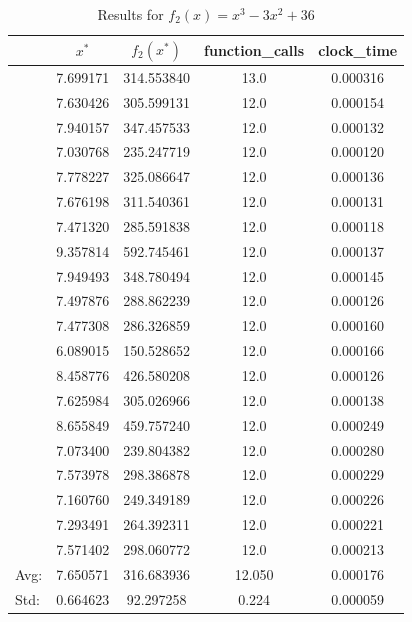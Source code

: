 \documentclass[11pt,onside]{article}
\begin{document}
\begin{description}
\begin {table}[ht]
\centering
\caption {Results for $f_{2}(x) = x^3 - 3x^2 + 36$}
\begin{tabular}{lcccc}
\toprule
{} &      $x^*$ &    $f_{2}(x^*)$ &  function\_calls &  clock\_time \\
\midrule
  &  7.699171 &  314.553840 &            13.0 &    0.000316 \\
  &  7.630426 &  305.599131 &            12.0 &    0.000154 \\
  &  7.940157 &  347.457533 &            12.0 &    0.000132 \\
  &  7.030768 &  235.247719 &            12.0 &    0.000120 \\
  &  7.778227 &  325.086647 &            12.0 &    0.000136 \\
  &  7.676198 &  311.540361 &            12.0 &    0.000131 \\
  &  7.471320 &  285.591838 &            12.0 &    0.000118 \\
  &  9.357814 &  592.745461 &            12.0 &    0.000137 \\
  &  7.949493 &  348.780494 &            12.0 &    0.000145 \\
  &  7.497876 &  288.862239 &            12.0 &    0.000126 \\
  &  7.477308 &  286.326859 &            12.0 &    0.000160 \\
  &  6.089015 &  150.528652 &            12.0 &    0.000166 \\
  &  8.458776 &  426.580208 &            12.0 &    0.000126 \\
  &  7.625984 &  305.026966 &            12.0 &    0.000138 \\
  &  8.655849 &  459.757240 &            12.0 &    0.000249 \\
  &  7.073400 &  239.804382 &            12.0 &    0.000280 \\
  &  7.573978 &  298.386878 &            12.0 &    0.000229 \\
  &  7.160760 &  249.349189 &            12.0 &    0.000226 \\
  &  7.293491 &  264.392311 &            12.0 &    0.000221 \\
  &  7.571402 &  298.060772 &            12.0 &    0.000213 \\
\bottomrule
Avg: & 7.650571 & 316.683936 & 12.050 & 0.000176 \\
Std:  & 0.664623 & 92.297258 & 0.224 & 0.000059\\
\bottomrule
\end{tabular}
\end {table}


\end{description}
\end{document}
